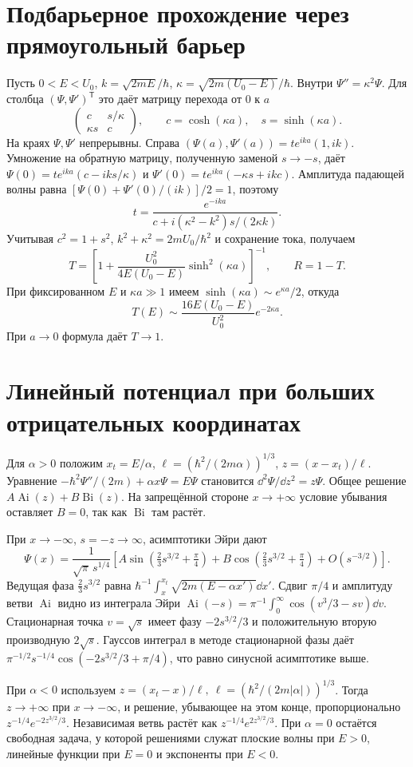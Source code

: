 \documentclass[11pt,a4paper]{article}
\begin{document}
\section{Подбарьерное прохождение через прямоугольный барьер}

Пусть \(0<E<U_0\), \(k=\sqrt{2mE}/\hbar\),
\(\kappa=\sqrt{2m(U_0-E)}/\hbar\).
Внутри \(\Psi''=\kappa^2\Psi\). Для столбца \((\Psi,\Psi')^{\mathsf T}\)
это даёт матрицу перехода от \(0\) к \(a\)
\[
 \begin{pmatrix}c&s/\kappa\\ \kappa s&c\end{pmatrix},\qquad
 c=\cosh(\kappa a),\quad s=\sinh(\kappa a).
\]
На краях \(\Psi,\Psi'\) непрерывны.
Справа \((\Psi(a),\Psi'(a))=te^{ika}(1,ik)\).
Умножение на обратную матрицу, полученную заменой \(s\to-s\),
даёт
\(\Psi(0)=te^{ika}(c-iks/\kappa)\) и
\(\Psi'(0)=te^{ika}(-\kappa s+ikc)\).
Амплитуда падающей волны равна
\([\Psi(0)+\Psi'(0)/(ik)]/2=1\), поэтому
\[
 t=\frac{e^{-ika}}{c+i(\kappa^2-k^2)s/(2\kappa k)}.
\]
Учитывая \(c^2=1+s^2\), \(k^2+\kappa^2=2mU_0/\hbar^2\) и
сохранение тока, получаем
\[
 T=\left[1+\frac{U_0^2}{4E(U_0-E)}
                        \sinh^2(\kappa a)\right]^{-1},\qquad R=1-T.
\]
При фиксированном \(E\) и \(\kappa a\gg1\) имеем
\(\sinh(\kappa a)\sim e^{\kappa a}/2\), откуда
\[
 T(E)\sim\frac{16E(U_0-E)}{U_0^2}e^{-2\kappa a}.
\]
При \(a\to0\) формула даёт \(T\to1\).

\section{Линейный потенциал при больших отрицательных координатах}

Для \(\alpha>0\) положим \(x_t=E/\alpha\),
\(\ell=(\hbar^2/(2m\alpha))^{1/3}\), \(z=(x-x_t)/\ell\).
Уравнение \(-\hbar^2\Psi''/(2m)+\alpha x\Psi=E\Psi\)
становится \(\dd^2\Psi/\dd z^2=z\Psi\).
Общее решение \(A\operatorname{Ai}(z)+B\operatorname{Bi}(z)\).
На запрещённой стороне \(x\to+\infty\) условие убывания
оставляет \(B=0\), так как \(\operatorname{Bi}\) там растёт.

При \(x\to-\infty\), \(s=-z\to\infty\), асимптотики Эйри дают
\[
 \Psi(x)=\frac1{\sqrt\pi\,s^{1/4}}
     \left[A\sin\!\left(\tfrac23s^{3/2}+\tfrac\pi4\right)
          +B\cos\!\left(\tfrac23s^{3/2}+\tfrac\pi4\right)
          +O(s^{-3/2})\right].
\]
Ведущая фаза \(\tfrac23s^{3/2}\) равна
\(\hbar^{-1}\int_x^{x_t}\sqrt{2m(E-\alpha x')}\dd x'\).
Сдвиг \(\pi/4\) и амплитуду ветви \(\operatorname{Ai}\)
видно из интеграла Эйри
\(\operatorname{Ai}(-s)=\pi^{-1}\int_0^\infty\cos(v^3/3-sv)\dd v\).
Стационарная точка \(v=\sqrt s\) имеет фазу \(-2s^{3/2}/3\)
и положительную вторую производную \(2\sqrt s\). Гауссов
интеграл в методе стационарной фазы даёт
\(\pi^{-1/2}s^{-1/4}\cos(-2s^{3/2}/3+\pi/4)\), что равно
синусной асимптотике выше.

При \(\alpha<0\) используем
\(z=(x_t-x)/\ell,\ \ell=(\hbar^2/(2m|\alpha|))^{1/3}\).
Тогда \(z\to+\infty\) при \(x\to-\infty\), и решение,
убывающее на этом конце, пропорционально
\(z^{-1/4}e^{-2z^{3/2}/3}\). Независимая ветвь растёт как
\(z^{-1/4}e^{2z^{3/2}/3}\). При \(\alpha=0\) остаётся
свободная задача, у которой решениями служат плоские волны
при \(E>0\), линейные функции при \(E=0\) и экспоненты при \(E<0\).
\end{document}
